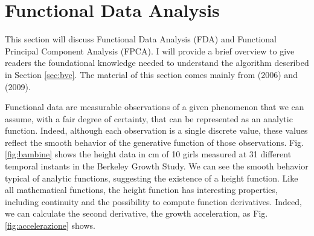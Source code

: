 \section{Functional Data Analysis}
\label{sec:fda}
This section will discuss Functional Data Analysis (FDA) and Functional Principal Component Analysis (FPCA). I will provide a brief overview to give readers the foundational knowledge needed to understand the algorithm described in Section \ref{sec:bvc}. The material of this section comes mainly from \citeauthor{ramsay_functional_2006} (2006) and \citeauthor{ramsay_functional_2009} (2009).

Functional data are measurable observations of a given phenomenon that we can assume, with a fair degree of certainty, that can be represented as an analytic function. Indeed, although each observation is a single discrete value, these values reflect the smooth behavior of the generative function of those observations. Fig. \ref{fig:bambine} shows the height data in \unit{\centi\metre} of 10 girls measured at 31 different temporal instants in the Berkeley Growth Study. We can see the smooth behavior typical of analytic functions, suggesting the existence of a height function. Like all mathematical functions, the height function has interesting properties, including continuity and the possibility to compute function derivatives. Indeed, we can calculate the second derivative, the growth acceleration, as Fig. \ref{fig:accelerazione} shows.
